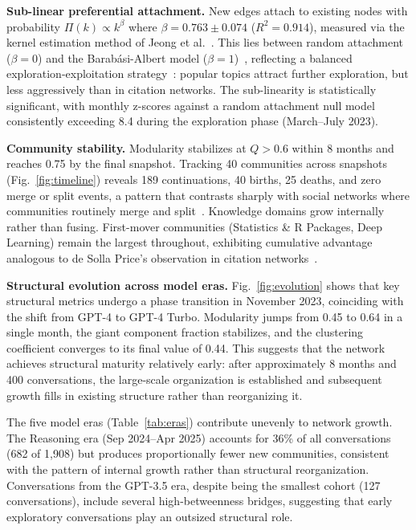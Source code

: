 \documentclass[journal]{IEEEtran}
\begin{document}
\textbf{Sub-linear preferential attachment.}
New edges attach to existing nodes with probability
$\Pi(k) \propto k^{\beta}$ where $\beta = 0.763 \pm 0.074$
($R^2 = 0.914$), measured via the kernel estimation method
of Jeong et al.~\cite{jeong2003measuring}.  This lies between random
attachment ($\beta = 0$) and the Barab\'{a}si-Albert model
($\beta = 1$)~\cite{barabasi1999emergence}, reflecting a balanced
exploration-exploitation strategy~\cite{hills2015exploration}: popular
topics attract further exploration, but less aggressively than in
citation networks.  The sub-linearity is statistically significant,
with monthly z-scores against a random attachment null model
consistently exceeding 8.4 during the exploration phase (March--July
2023).

\textbf{Community stability.}
Modularity stabilizes at $Q > 0.6$ within 8 months and reaches 0.75 by
the final snapshot.  Tracking 40 communities across snapshots
(Fig.~\ref{fig:timeline}) reveals 189 continuations, 40 births, 25
deaths, and zero merge or split events, a pattern that contrasts
sharply with social networks where communities routinely merge and
split~\cite{palla2007quantifying}.  Knowledge domains grow internally
rather than fusing.  First-mover communities (Statistics \& R Packages,
Deep Learning) remain the largest throughout, exhibiting cumulative
advantage analogous to de Solla Price's observation in citation
networks~\cite{price1965networks}.

\textbf{Structural evolution across model eras.}
Fig.~\ref{fig:evolution} shows that key structural metrics undergo a
phase transition in November 2023, coinciding with the shift from GPT-4
to GPT-4 Turbo.  Modularity jumps from 0.45 to 0.64 in a single month,
the giant component fraction stabilizes, and the clustering coefficient
converges to its final value of 0.44.  This suggests that the network
achieves structural maturity relatively early: after approximately 8
months and 400 conversations, the large-scale organization is
established and subsequent growth fills in existing structure rather
than reorganizing it.

The five model eras (Table~\ref{tab:eras}) contribute unevenly to
network growth.  The Reasoning era (Sep 2024--Apr 2025) accounts for
36\% of all conversations (682 of 1,908) but produces proportionally
fewer new communities, consistent with the pattern of internal growth
rather than structural reorganization.  Conversations from the GPT-3.5
era, despite being the smallest cohort (127 conversations), include
several high-betweenness bridges, suggesting that early exploratory
conversations play an outsized structural role.
\end{document}
